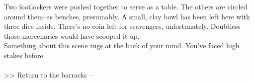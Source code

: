 Two footlockers were pushed together to serve as a table. The others are circled around them--as benches, presumably. A small, clay bowl has been left here with three dice inside. There’s no coin left for scavengers, unfortunately. Doubtless those mercenaries would have scooped it up.\\

Something about this scene tugs at the back of your mind. You’ve faced high stakes before.\\
\\

>> Return to the barracks -- 